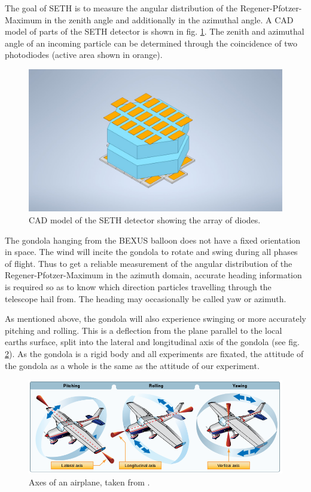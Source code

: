 The goal of \ac{SETH} is to measure the angular distribution of the Regener-Pfotzer-Maximum in the zenith angle and additionally in the azimuthal angle. A \ac{CAD} model of parts of the \ac{SETH} detector is shown in fig. \ref{fig:seth_cad}. The zenith and azimuthal angle of an incoming particle can be determined through the coincidence of two photodiodes (active area shown in orange).

\begin{figure}[H]
    \centering
    \includegraphics[width=0.5\linewidth, trim = {5cm 0cm 5cm 0cm}, clip]{images/01_background/SETH-Sketch.jpeg}
    \caption[\ac{SETH} detector sketch]{\ac{CAD} model of the \ac{SETH} detector showing the array of diodes.}
    \label{fig:seth_cad}
\end{figure}

The gondola hanging from the \ac{BEXUS} balloon does not have a fixed orientation in space. The wind will incite the gondola to rotate and swing during all phases of flight. Thus to get a reliable measurement of the angular distribution of the Regener-Pfotzer-Maximum in the azimuth domain, accurate heading information is required so as to know which direction particles travelling through the telescope hail from. The heading may occasionally be called yaw or azimuth.


As mentioned above, the gondola will also experience swinging or more accurately pitching and rolling. This is a deflection from the plane parallel to the local earths surface, split into the lateral and longitudinal axis of the gondola (see fig. \ref{fig:attitude}). As the gondola is a rigid body and all experiments are fixated, the attitude of the gondola as a whole is the same as the attitude of our experiment.


\begin{figure}[H]
    \centering
    \includegraphics[width=0.5\linewidth]{images/01_background/axes_of_an_airplane.png}
    \caption[Axes of an airplane]{Axes of an airplane, taken from \cite{pilot-handbook}.}
    \label{fig:attitude}
\end{figure}

